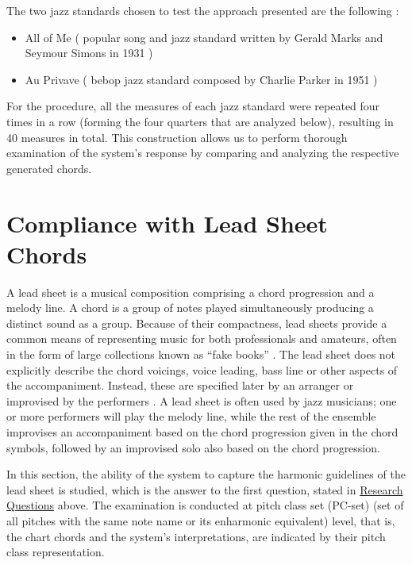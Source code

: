     The two jazz standards chosen to test the approach presented are the following : 
    \begin{itemize}
        \item All of Me ( popular song and jazz standard written by Gerald Marks and Seymour Simons in 1931 )
        \item Au Privave ( bebop jazz standard composed by Charlie Parker in 1951 )
    \end{itemize}    
    
    For the procedure, all the measures of each jazz standard were repeated four times in a row (forming the four quarters that are analyzed below), resulting in 40 measures in total. This construction allows us to perform thorough examination of the system's response by comparing and analyzing the respective generated chords.


    
    \section{Compliance with Lead Sheet Chords}
    A lead sheet is a musical composition comprising a chord progression and a melody line. A chord is a group of notes played simultaneously producing a distinct sound as a group. Because of their compactness, lead sheets provide a common means of representing music for both professionals and amateurs, often in the form of large collections known as ``fake books” \cite{keller2010impro}. The lead sheet does not explicitly describe the chord voicings, voice leading, bass line or other aspects of the accompaniment. Instead, these are specified later by an arranger or improvised by the performers \cite{benward1997music}. A lead sheet is often used by jazz musicians; one or more performers will play the melody line, while the rest of the ensemble improvises an accompaniment based on the chord progression given in the chord symbols, followed by an improvised solo also based on the chord progression.

    In this section, the ability of the system to capture the harmonic guidelines of the lead sheet is studied, which is the answer to the first question, stated in \hyperref[sec:researchQuestions]{Research Questions} above. The examination is conducted at pitch class set (PC-set) (set of all pitches with the same note name or its enharmonic equivalent) level, 
    that is, the chart chords and the system's interpretations, are indicated by their pitch class representation.  
    
